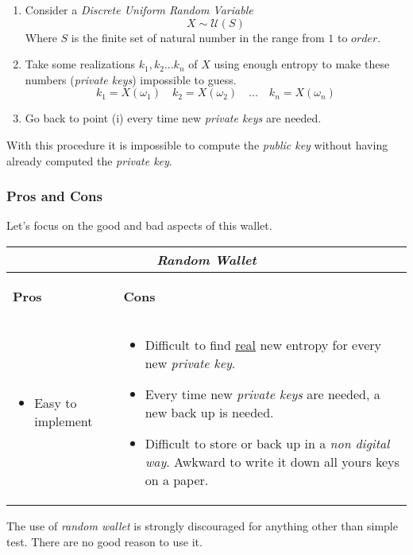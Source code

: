 \begin{enumerate}[label=(\roman*)]
	\item Consider a \textit{Discrete Uniform Random Variable}
	\begin{equation*}
	X\sim \mathcal{U}(S)
	\end{equation*}
	Where $S$ is the finite set of natural number in the range from $1$ to $order$.
	\item Take some realizations $k_1,k_2...k_n$ of $X$ using enough entropy to make these numbers (\textit{private keys}) impossible to guess.
	\begin{equation*}
	k_1=X(\omega_1) \quad  k_2=X(\omega_2) \quad ... \quad k_n=X(\omega_n)
	\end{equation*}
	\item Go back to point (i) every time new \textit{private keys} are needed.
\end{enumerate}
With this procedure it is impossible to compute the \textit{public key} without having already computed the \textit{private key}.

\subsubsection{Pros and Cons}
Let's focus on the good and bad aspects of this wallet.

\begin{center}
	\begin{tabular}{ |p{6cm}|p{6cm}|  }
		\hline
		\multicolumn{2}{|c|}{\textbf{\textit{Random Wallet}}} \\
		\hline \hline 
		\begin{center}
			\textbf{Pros}
		\end{center}&\begin{center}
			\textbf{Cons}
		\end{center}\\
		\hline
		\begin{itemize}
			\item Easy to implement
		\end{itemize} &
		\begin{itemize}
			\item Difficult to find \underline{real} new entropy for every new \textit{private key}.
			\item Every time new \textit{private keys} are needed, a new back up is needed.
			\item Difficult to store or back up in a \textit{non digital way}. Awkward to write it down all yours keys on a paper.
		\end{itemize}\\
		\hline
	\end{tabular}
\end{center}
The use of \textit{random wallet} is strongly discouraged for anything other than simple test. There are no good reason to use it.

